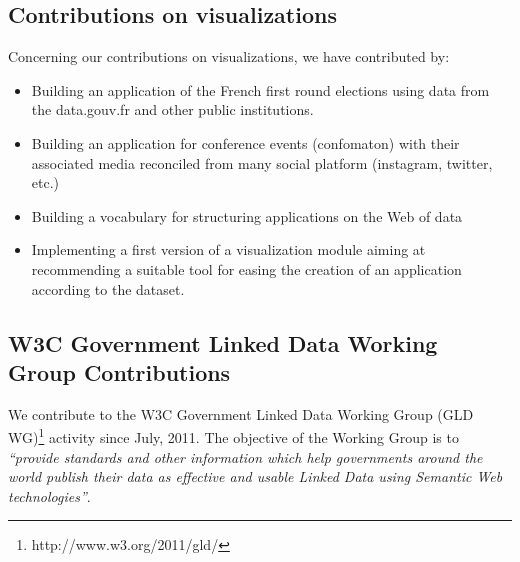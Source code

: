 \documentclass[a4paper,11pt]{report}
\begin{document}
\subsection{Contributions on visualizations}
Concerning our contributions on visualizations, we have contributed by:
\begin{itemize}
\item Building an application of the French first round elections using data from the data.gouv.fr and other public institutions.
\item Building an application for conference events (confomaton) with their associated media reconciled from many social platform (instagram, twitter, etc.)
\item Building a vocabulary for structuring applications on the Web of data
\item Implementing a first version of a visualization module aiming at recommending a suitable tool for easing the creation of an application according to the dataset.

\end{itemize}

\subsection{W3C Government Linked Data Working Group Contributions}
We contribute to the W3C Government Linked Data Working Group (GLD WG)\footnote{http://www.w3.org/2011/gld/} activity since July, 2011.  The objective of the Working Group is to \textit{``provide standards and other information which help governments around the world publish their data as effective and usable Linked Data using Semantic Web technologies''}. %
\end{document}
